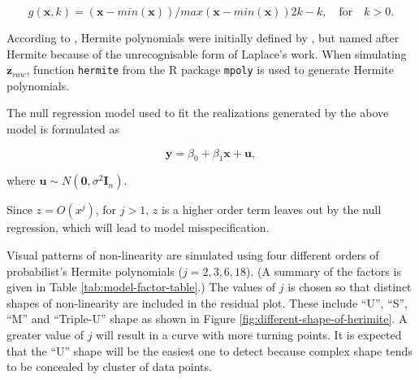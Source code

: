 \documentclass[]{interact}
\theoremstyle{plain}%
\theoremstyle{definition}
\theoremstyle{remark}
\begin{document}
\begin{equation} \label{eq:scaling-function}
g(\boldsymbol{x}, k) = (\boldsymbol{x} - min(\boldsymbol{x}))/max(\boldsymbol{x} - min(\boldsymbol{x}))2k - k, \quad \text{for} \quad k > 0. 
\end{equation}

According to \citet{abramowitz1964handbook}, Hermite polynomials were
initially defined by \citet{de1820theorie}, but named after Hermite
\citep{hermite1864nouveau} because of the unrecognisable form of
Laplace's work. When simulating \(\boldsymbol{z}_{raw}\), function
\texttt{hermite} from the R package \texttt{mpoly} \citep{mpoly} is used
to generate Hermite polynomials.

The null regression model used to fit the realizations generated by the
above model is formulated as

\begin{equation} \label{eq:null-model}
\boldsymbol{y} = \beta_0 + \beta_1 \boldsymbol{x} + \boldsymbol{u},
\end{equation}

\noindent where
\(\boldsymbol{u} \sim N(\boldsymbol{0}, \sigma^2\boldsymbol{I}_n)\).

Since \(z = O(x^j)\), for \(j > 1\), \(z\) is a higher order term leaves
out by the null regression, which will lead to model misspecification.

Visual patterns of non-linearity are simulated using four different
orders of probabilist's Hermite polynomials (\(j = 2, 3, 6, 18\)). (A
summary of the factors is given in Table \ref{tab:model-factor-table}.)
The values of \(j\) is chosen so that distinct shapes of non-linearity
are included in the residual plot. These include ``U'', ``S'', ``M'' and
``Triple-U'' shape as shown in Figure
\ref{fig:different-shape-of-herimite}. A greater value of \(j\) will
result in a curve with more turning points. It is expected that the
``U'' shape will be the easiest one to detect because complex shape
tends to be concealed by cluster of data points.
\end{document}
